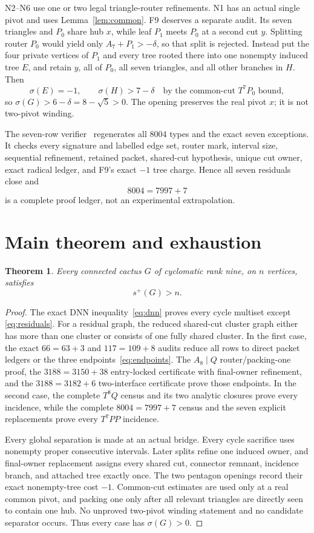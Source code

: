 \documentclass[11pt]{article}
\newtheorem{theorem}{Theorem}[section]
\newcommand{\spE}{s^+}
\newcommand{\sig}{\sigma}
\begin{document}
N2--N6 use one or two legal triangle-router refinements.  N1 has an actual
single pivot and uses Lemma~\ref{lem:common}.  F9 deserves a separate audit.
Its seven triangles and $P_0$ share hub $x$, while leaf $P_1$ meets $P_0$ at a
second cut $y$.  Splitting router $P_0$ would yield only
$A_7+P_1>-\delta$, so that split is rejected.  Instead put the four private
vertices of $P_1$ and every tree rooted there into one nonempty induced tree
$E$, and retain $y$, all of $P_0$, all seven triangles, and all other branches
in $H$.  Then
\[
 \sig(E)=-1,
 \qquad \sig(H)>7-\delta
 \quad\text{by the common-cut $T^7P_0$ bound},
\]
so $\sig(G)>6-\delta=8-\sqrt5>0$.  The opening preserves the real pivot $x$;
it is not two-pivot winding.

The seven-row verifier~\cite{Seven,SevenCode} regenerates all $8004$ types and
the exact seven exceptions.  It checks every signature and labelled edge set,
router mark, interval size, sequential refinement, retained packet, shared-cut
hypothesis, unique cut owner, exact radical ledger, and F9's exact $-1$ tree
charge.  Hence all seven residuals close and
\[
 8004=7997+7
\]
is a complete proof ledger, not an experimental extrapolation.

\section{Main theorem and exhaustion}

\begin{theorem}\label{thm:main}
Every connected cactus $G$ of cyclomatic rank nine, on $n$ vertices, satisfies
\[
 \boxed{\spE(G)>n}.
\]
\end{theorem}

\begin{proof}
The exact DNN inequality~\eqref{eq:dnn} proves every cycle multiset except
\eqref{eq:residuals}.  For a residual graph, the reduced shared-cut cluster
graph either has more than one cluster or consists of one fully shared cluster.
In the first case, the exact $66=63+3$ and $117=109+8$ audits reduce all rows
to direct packet ledgers or the three endpoints~\eqref{eq:endpoints}.  The
$A_8\mid Q$ router/packing-one proof, the $3188=3150+38$ entry-locked
certificate with final-owner refinement, and the $3188=3182+6$ two-interface
certificate prove those endpoints.  In the second case, the complete $T^8Q$
census and its two analytic closures prove every incidence, while the complete
$8004=7997+7$ census and the seven explicit replacements prove every $T^7PP$
incidence.

Every global separation is made at an actual bridge.  Every cycle sacrifice
uses nonempty proper consecutive intervals.  Later splits refine one induced
owner, and final-owner replacement assigns every shared cut, connector remnant,
incidence branch, and attached tree exactly once.  The two pentagon openings
record their exact nonempty-tree cost $-1$.  Common-cut estimates are used only
at a real common pivot, and packing one only after all relevant triangles are
directly seen to contain one hub.  No unproved two-pivot winding statement and
no candidate separator occurs.  Thus every case has $\sig(G)>0$.
\end{proof}
\end{document}
